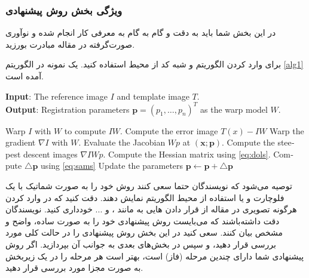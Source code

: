 \documentclass{CCI2020}
\begin{document}
\subsubsection{ویژگی بخش روش پیشنهادی}
\label{Sec:TheProposedMethod}
در این بخش شما باید  به دقت و گام به گام به معرفی کار انجام شده و نوآوری صورت‌گرفته در مقاله مبادرت بورزید. 

برای وارد کردن الگوریتم و شبه کد از محیط
  استفاده کنید. یک نمونه در الگوریتم
\ref{alg1}
  آمده است.
\begin{algorithm}[t]
\caption{الگوریتم ثبت تصویر لوکاس-کاناد مبتنی بر بهینه‌سازی گوس-نیوتون .}
\label{alg1}
\begin{latin}
\textbf{Input}:
The reference image $I$ and template image $T$.\\
\textbf{Output}: Registration parameters
$\mathbf{p}=(p_1,\dots,p_n)^T$ as the warp model $W$.
\begin{algorithmic}[1]
\REPEAT
  \STATE Warp $I$ with $W$ to compute $IW$. 
  \STATE Compute the error image $T(x)-IW$ 
  \STATE Warp the gradient $\nabla I$ with $W$. \STATE Evaluate the Jacobian
    ${W}{p}$ at $(\mathbf{x;p})$. 
  \STATE Compute the steepest descent images $\nabla I{W}{p}$. 
\LOOP {} \ENDLOOP
  \STATE \label{line:Hessian} Compute the Hessian matrix using   \eqref{eq:dols}. 
  \ENDFOR
  \STATE \label{alg1:deltap} Compute $\triangle\mathbf{p}$ using \eqref{eq:sams} 
\RETURN Update the parameters $\mathbf{p}\leftarrow\mathbf{p}+\triangle\mathbf{p}$ 
\end{algorithmic}
\end{latin}
\end{algorithm}

توصیه می‌شود که نویسندگان حتما سعی کنند روش خود را به صورت شماتیک با یک فلوچارت و یا استفاده از محیط الگوریتم نمایش دهند. دقت کنید که در وارد کردن هرگونه تصویری در مقاله از قرار دادن
  هایی به مانند
،  و ...
خودداری کنید. نویسندگان دقت داشته‌باشند که می‌بایست روش پیشنهادی خود را به صورت ساده، واضح و مشخص بیان کنند. سعی کنید در این بخش روش پیشنهادی را در حالت کلی مورد بررسی قرار دهید، و سپس در بخش‌های بعدی به جوانب آن بپردازید. اگر روش پیشنهادی شما دارای چندین مرحله (فاز) است، بهتر است هر مرحله را در یک زیربخش به صورت مجزا مورد بررسی قرار دهید.
\end{document}
